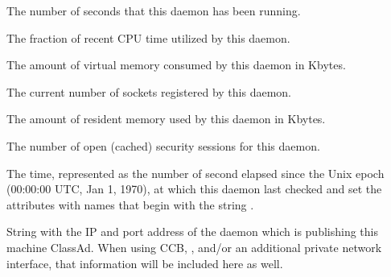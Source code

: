 \begin{description}
\item[\AdAttr{MonitorSelfAge}:] The number of seconds that this daemon
  has been running.

\item[\AdAttr{MonitorSelfCPUUsage}:] The fraction of recent CPU time utilized
  by this daemon. 

\item[\AdAttr{MonitorSelfImageSize}:] The amount of virtual memory consumed by
  this daemon in Kbytes.

\item[\AdAttr{MonitorSelfRegisteredSocketCount}:] The current number of sockets
  registered by this daemon.

\item[\AdAttr{MonitorSelfResidentSetSize}:] The amount of resident memory
  used by this daemon in Kbytes.

\item[\AdAttr{MonitorSelfSecuritySessions}:] The number of open (cached)
  security sessions for this daemon.

\item[\AdAttr{MonitorSelfTime}:] The  time, represented as the number of
  second elapsed since the Unix epoch (00:00:00 UTC, Jan 1, 1970),
  at which this daemon last checked and set the attributes with names that
  begin with the string .
  
\item[\AdAttr{MyAddress}:] String with the IP and port address of the
 daemon which is publishing this machine ClassAd.
When using CCB, , and/or an additional private
network interface, that information will be included here as well.


\end{description}
